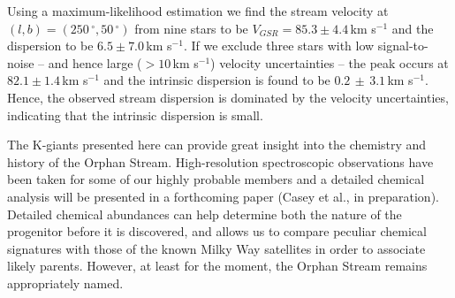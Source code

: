 Using a maximum-likelihood estimation we find the stream velocity at $(l, b) = (250\,^\circ, 50\,^\circ)$ from nine stars to be $V_{GSR} = 85.3 \pm 4.4$\,km s$^{-1}$ and the dispersion to be $6.5 \pm 7.0$\,km s$^{-1}$. If we exclude three stars with low signal-to-noise \--- and hence large ($> 10$\,km s$^{-1}$) velocity uncertainties \--- the peak occurs at $82.1 \pm 1.4$\,km s$^{-1}$ and the intrinsic dispersion is found to be $0.2\,\pm\,3.1$\,km s$^{-1}$. Hence, the observed stream dispersion is dominated by the velocity uncertainties, indicating that the intrinsic dispersion is small. 

The K-giants presented here can provide great insight into the chemistry and history of the Orphan Stream. High-resolution spectroscopic observations have been taken for some of our highly probable members and a detailed chemical analysis will be presented in a forthcoming paper (Casey et al., in preparation). Detailed chemical abundances can help determine both the nature of the progenitor before it is discovered, and allows us to compare peculiar chemical signatures with those of the known Milky Way satellites in order to associate likely parents. However, at least for the moment, the Orphan Stream remains appropriately named.

